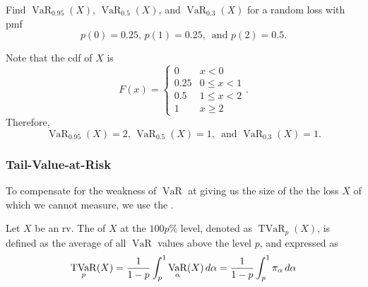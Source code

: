 \documentclass[notoc,notitlepage]{tufte-book}
\DeclareMathOperator{\VaR}{VaR}
\DeclareMathOperator{\TVaR}{TVaR}
\begin{document}
\begin{eg}
  Find $\VaR_{0.95}(X)$, $\VaR_{0.5}(X)$, and $\VaR_{0.3}(X)$ for a random loss with pmf
  \begin{equation*}
    p(0) = 0.25, \, p(1) = 0.25, \, \text{ and } p(2) = 0.5.
  \end{equation*}
\end{eg}

\begin{solution}
  Note that the cdf of $X$ is
  \begin{equation*}
    F(x) = \begin{cases}
      0    & x < 0 \\
      0.25 & 0 \leq x < 1 \\
      0.5  & 1 \leq x < 2 \\
      1    & x \geq 2
    \end{cases}.
  \end{equation*}
  Therefore,
  \begin{equation*}
    \VaR_{0.95}(X) = 2, \, \VaR_{0.5}(X) = 1, \, \text{ and } \VaR_{0.3}(X) = 1.
  \end{equation*}
\end{solution}

\subsubsection{Tail-Value-at-Risk}
\label{ssub:Tail-Value-at-Risk}

To compensate for the weakness of $\VaR$ at giving us the size of the the loss $X$ of which we cannot measure, we use the .

\begin{defn}
\label{defn:tail_value_at_risk}
Let $X$ be an rv. The  of $X$ at the $100p\%$ level, denoted as $\TVaR_p(X)$, is defined as the average of all $\VaR$ values above the level $p$, and expressed as
  \begin{equation*}
    \TVaR_p(X) = \frac{1}{1 - p} \int_{p}^{1} \VaR_\alpha(X) \dif{\alpha} = \frac{1}{1 - p} \int_{p}^{1} \pi_\alpha \dif{\alpha}
  \end{equation*}
\end{defn}
\end{document}
